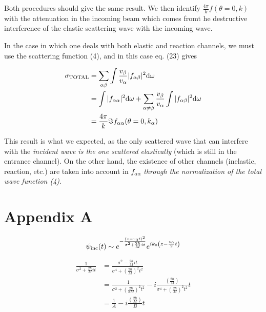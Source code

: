 Both procedures should give the same result. We then identify $\frac{4\pi}{k} f(\theta=0,k)$ with the attenuation in the incoming beam which comes fromt he destructive interference of the elastic scattering wave with the incoming wave.

In the case in which one deals with both elastic and reaction channels, we must use the scattering function (4), and in this case eq. (23) gives

\begin{equation}
\begin{split}
\sigma_{\rm TOTAL} &= \sum_{\alpha \beta} \int \frac{v_{\beta}}{v_{\alpha}} |f_{\alpha \beta}|^2 {\rm d}\omega \\
&= \int |f_{\alpha \alpha}|^2 {\rm d}\omega + \sum_{\alpha \neq \beta} \frac{v_{\beta}}{v_{\alpha}} \int |f_{\alpha \beta}|^2 {\rm d}\omega \\
&= \frac{4\pi}{k} \Im f_{\alpha \alpha}(\theta=0, k_{\alpha})
\end{split}
\end{equation}

This result is what we expected, as the only scattered wave that can interfere with the {\it incident wave is the one scattered elastically} (which is still in the entrance channel). On the other hand, the existence of other channels (inelastic, reaction, etc.) are taken into account in $f_{\alpha \alpha}$ {\it through the normalization of the total wave function (4)}.




\section{Appendix A}

\begin{equation}
\nonumber
\psi_{\rm inc}(t) \sim e^{- \frac{(z-v_0 t)^2}{\sigma^2 + \frac{2 \hbar}{M} i t}} e^{i k_0 \left( z - \frac{v_0}{2} t \right)}
\end{equation}

\begin{equation}
\nonumber
\begin{split}
\frac{1}{\sigma^2 + \frac{2 \hbar}{M} i t} &= \frac{\sigma^2 - \frac{2 \hbar}{M} i t}{\sigma^4 + \left( \frac{2 \hbar}{M} \right)^2 t^2} \\
&= \frac{1}{\sigma^2 + \left( \frac{2 \hbar}{\sigma M} \right)^2 t^2} - i \frac{\left( \frac{2\hbar}{M} \right)}{\sigma^4 + \left( \frac{2 \hbar}{M} \right)^2 t^2} t \\
&= \frac{1}{A} - i \frac{\left( \frac{2\hbar}{M} \right)}{B} t
\end{split}
\end{equation}

